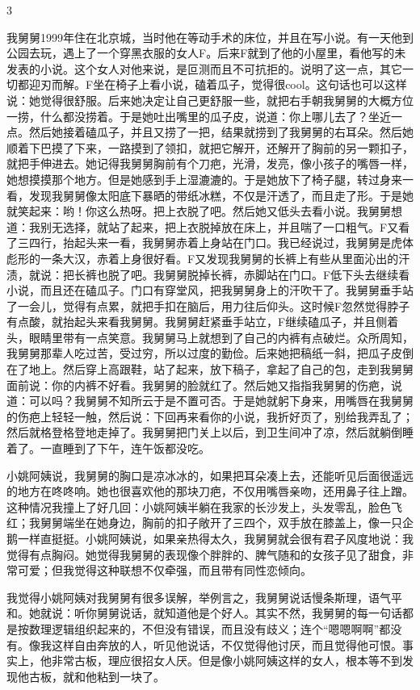 3 

我舅舅1999年住在北京城，当时他在等动手术的床位，并且在写小说。有一天他到公园去玩，遇上了一个穿黑衣服的女人F。后来F就到了他的小屋里，看他写的未发表的小说。这个女人对他来说，是叵测而且不可抗拒的。说明了这一点，其它一切都迎刃而解。F坐在椅子上看小说，磕着瓜子，觉得很cool。这句话也可以这样说：她觉得很舒服。后来她决定让自己更舒服一些，就把右手朝我舅舅的大概方位一捞，什么都没捞着。于是她吐出嘴里的瓜子皮，说道：你上哪儿去了？坐近一点。然后她接着磕瓜子，并且又捞了一把，结果就捞到了我舅舅的右耳朵。然后她顺着下巴摸了下来，一路摸到了领扣，就把它解开，还解开了胸前的另一颗扣子，就把手伸进去。她记得我舅舅胸前有个刀疤，光滑，发亮，像小孩子的嘴唇一样，她想摸摸那个地方。但是她感到手上湿漉漉的。于是她放下了椅子腿，转过身来一看，发现我舅舅像太阳底下暴晒的带纸冰糕，不仅是汗透了，而且走了形。于是她就笑起来：哟！你这么热呀。把上衣脱了吧。然后她又低头去看小说。我舅舅想道：我别无选择，就站了起来，把上衣脱掉放在床上，并且喘了一口粗气。F又看了三四行，抬起头来一看，我舅舅赤着上身站在门口。我已经说过，我舅舅是虎体彪形的一条大汉，赤着上身很好看。F又发现我舅舅的长裤上有些从里面沁出的汗渍，就说：把长裤也脱了吧。我舅舅脱掉长裤，赤脚站在门口。F低下头去继续看小说，而且还在磕瓜子。门口有穿堂风，把我舅舅身上的汗吹干了。我舅舅垂手站了一会儿，觉得有点累，就把手扣在脑后，用力往后仰头。这时候F忽然觉得脖子有点酸，就抬起头来看我舅舅。我舅舅赶紧垂手站立，F继续磕瓜子，并且侧着头，眼睛里带有一点笑意。我舅舅马上就想到了自己的内裤有点破烂。众所周知，我舅舅那辈人吃过苦，受过穷，所以过度的勤俭。后来她把稿纸一斜，把瓜子皮倒在了地上。然后穿上高跟鞋，站了起来，放下稿子，拿起了自己的包，走到我舅舅面前说：你的内裤不好看。我舅舅的脸就红了。然后她又指指我舅舅的伤疤，说道：可以吗？我舅舅不知所云于是不置可否。于是她就躬下身来，用嘴唇在我舅舅的伤疤上轻轻一触，然后说：下回再来看你的小说，我折好页了，别给我弄乱了；然后就格登格登地走掉了。我舅舅把门关上以后，到卫生间冲了凉，然后就躺倒睡着了。一直睡到了下午，连午饭都没吃。 

小姚阿姨说，我舅舅的胸口是凉冰冰的，如果把耳朵凑上去，还能听见后面很遥远的地方在咚咚响。她也很喜欢他的那块刀疤，不仅用嘴唇亲吻，还用鼻子往上蹭。这种情况我撞上了好几回：小姚阿姨半躺在我家的长沙发上，头发零乱，脸色飞红；我舅舅端坐在她身边，胸前的扣子敞开了三四个，双手放在膝盖上，像一只企鹅一样直挺挺。小姚阿姨说，如果亲热得太久，我舅舅就会很有君子风度地说：我觉得有点胸闷。她觉得我舅舅的表现像个胖胖的、脾气随和的女孩子见了甜食，非常可爱；但我觉得这种联想不仅牵强，而且带有同性恋倾向。 

我觉得小姚阿姨对我舅舅有很多误解，举例言之，我舅舅说话慢条斯理，语气平和。她就说：听你舅舅说话，就知道他是个好人。其实不然，我舅舅的每一句话都是按数理逻辑组织起来的，不但没有错误，而且没有歧义；连个“嗯嗯啊啊”都没有。像我这样自由奔放的人，听见他说话，不仅觉得他讨厌，而且觉得他可恨。事实上，他非常古板，理应很招女人厌。但是像小姚阿姨这样的女人，根本等不到发现他古板，就和他粘到一块了。 

